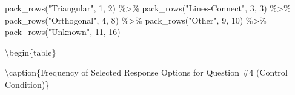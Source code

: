 \documentclass[
  letterpaper,
  DIV=11,
  numbers=noendperiod]{scrreprt}
\newenvironment{Shaded}{\begin{snugshade}}{\end{snugshade}}
\newcommand{\DecValTok}[1]{\textcolor[rgb]{0.68,0.00,0.00}{#1}}
\newcommand{\FunctionTok}[1]{\textcolor[rgb]{0.28,0.35,0.67}{#1}}
\newcommand{\NormalTok}[1]{\textcolor[rgb]{0.00,0.23,0.31}{#1}}
\newcommand{\SpecialCharTok}[1]{\textcolor[rgb]{0.37,0.37,0.37}{#1}}
\newcommand{\StringTok}[1]{\textcolor[rgb]{0.13,0.47,0.30}{#1}}
\begin{document}
\begin{Shaded}
\begin{Highlighting}[]
  \FunctionTok{pack\_rows}\NormalTok{(}\StringTok{"Triangular"}\NormalTok{, }\DecValTok{1}\NormalTok{, }\DecValTok{2}\NormalTok{) }\SpecialCharTok{\%\textgreater{}\%} 
  \FunctionTok{pack\_rows}\NormalTok{(}\StringTok{"Lines{-}Connect"}\NormalTok{, }\DecValTok{3}\NormalTok{, }\DecValTok{3}\NormalTok{) }\SpecialCharTok{\%\textgreater{}\%} 
  \FunctionTok{pack\_rows}\NormalTok{(}\StringTok{"Orthogonal"}\NormalTok{, }\DecValTok{4}\NormalTok{, }\DecValTok{8}\NormalTok{) }\SpecialCharTok{\%\textgreater{}\%} 
  \FunctionTok{pack\_rows}\NormalTok{(}\StringTok{"Other"}\NormalTok{, }\DecValTok{9}\NormalTok{, }\DecValTok{10}\NormalTok{) }\SpecialCharTok{\%\textgreater{}\%} 
  \FunctionTok{pack\_rows}\NormalTok{(}\StringTok{"Unknown"}\NormalTok{, }\DecValTok{11}\NormalTok{, }\DecValTok{16}\NormalTok{) }
\end{Highlighting}
\end{Shaded}

\textbackslash begin\{table\}

\textbackslash caption\{\label{tab:Q4-CONTROL-RESPONSES}Frequency of
Selected Response Options for Question \#4 (Control Condition)\}
\centering
\end{document}
